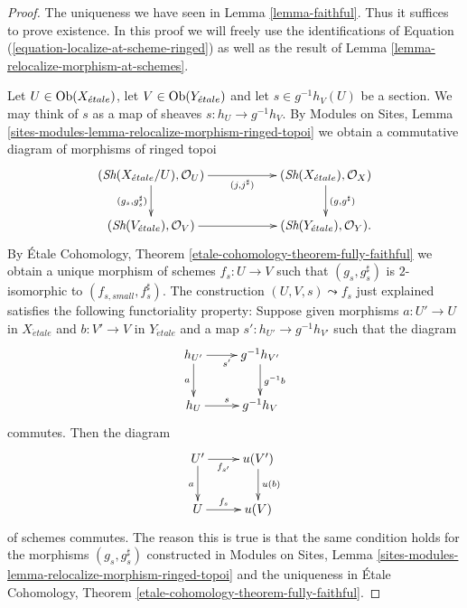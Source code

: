 \begin{proof}
The uniqueness we have seen in
Lemma \ref{lemma-faithful}.
Thus it suffices to prove existence.
In this proof we will freely use the identifications of
Equation (\ref{equation-localize-at-scheme-ringed})
as well as the result of
Lemma \ref{lemma-relocalize-morphism-at-schemes}.

\medskip\noindent
Let $U \in \mathop{\rm Ob}\nolimits(X_{\acute{e}tale})$, let
$V \in \mathop{\rm Ob}\nolimits(Y_{\acute{e}tale})$
and let $s \in g^{-1}h_V(U)$ be a section. We may think of
$s$ as a map of sheaves $s : h_U \to g^{-1}h_V$. By
Modules on Sites,
Lemma \ref{sites-modules-lemma-relocalize-morphism-ringed-topoi}
we obtain a commutative diagram of morphisms of ringed topoi
$$
\xymatrix{
(\Sh(X_{\acute{e}tale}/U), \mathcal{O}_U)
\ar[rr]_-{(j, j^\sharp)} \ar[d]_{(g_s, g_s^\sharp)} & &
(\Sh(X_{\acute{e}tale}), \mathcal{O}_X) \ar[d]^{(g, g^\sharp)} \\
(\Sh(V_{\acute{e}tale}), \mathcal{O}_V) \ar[rr] & &
(\Sh(Y_{\acute{e}tale}), \mathcal{O}_Y).
}
$$
By
\'Etale Cohomology, Theorem \ref{etale-cohomology-theorem-fully-faithful}
we obtain a unique morphism of schemes $f_s : U \to V$ such that
$(g_s, g_s^\sharp)$ is $2$-isomorphic to $(f_{s, small}, f_s^\sharp)$.
The construction $(U, V, s) \leadsto f_s$ just explained satisfies
the following functoriality property: Suppose given morphisms
$a : U' \to U$ in $X_{\acute{e}tale}$ and $b : V' \to V$ in $Y_{\acute{e}tale}$
and a map $s' : h_{U'} \to g^{-1}h_{V'}$ such that the diagram
$$
\xymatrix{
h_{U'} \ar[d]_a \ar[r]_{s'} & g^{-1}h_{V'} \ar[d]^{g^{-1}b} \\
h_U \ar[r]^s & g^{-1}h_V
}
$$
commutes. Then the diagram
$$
\xymatrix{
U' \ar[r]_-{f_{s'}} \ar[d]_a & u(V') \ar[d]^{u(b)} \\
U \ar[r]^-{f_s} & u(V)
}
$$
of schemes commutes. The reason this is true is that the same condition
holds for the morphisms $(g_s, g_s^\sharp)$ constructed in
Modules on Sites,
Lemma \ref{sites-modules-lemma-relocalize-morphism-ringed-topoi}
and the uniqueness in
\'Etale Cohomology, Theorem \ref{etale-cohomology-theorem-fully-faithful}.


\end{proof}
